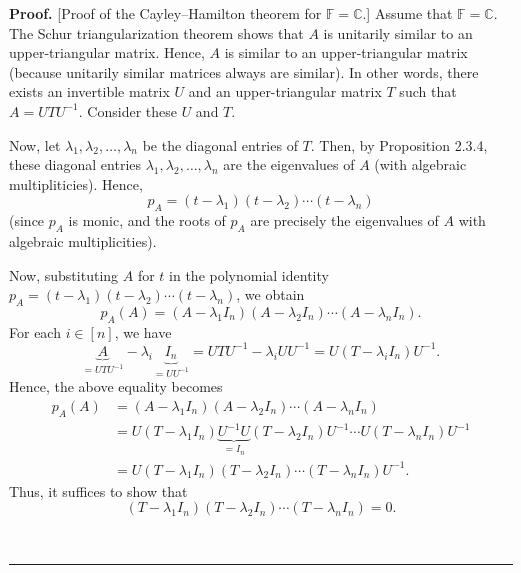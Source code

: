 \documentclass[numbers=enddot,12pt,final,onecolumn,notitlepage]{scrartcl}%
\numberwithin{exer}{subsection}
\theoremstyle{definition}
\newenvironment{proof}[1][Proof]{\noindent\textbf{#1.} }{\ \rule{0.5em}{0.5em}}
\begin{document}
\begin{proof}
[Proof of the Cayley--Hamilton theorem for $\mathbb{F}=\mathbb{C}$.] Assume
that $\mathbb{F}=\mathbb{C}$. The Schur triangularization theorem shows that
$A$ is unitarily similar to an upper-triangular matrix. Hence, $A$ is similar
to an upper-triangular matrix (because unitarily similar matrices always are
similar). In other words, there exists an invertible matrix $U$ and an
upper-triangular matrix $T$ such that $A=UTU^{-1}$. Consider these $U$ and $T$.

Now, let $\lambda_{1},\lambda_{2},\ldots,\lambda_{n}$ be the diagonal entries
of $T$. Then, by Proposition 2.3.4, these diagonal entries $\lambda
_{1},\lambda_{2},\ldots,\lambda_{n}$ are the eigenvalues of $A$ (with
algebraic multipliticies). Hence,%
\[
p_{A}=\left(  t-\lambda_{1}\right)  \left(  t-\lambda_{2}\right)
\cdots\left(  t-\lambda_{n}\right)
\]
(since $p_{A}$ is monic, and the roots of $p_{A}$ are precisely the
eigenvalues of $A$ with algebraic multiplicities).

Now, substituting $A$ for $t$ in the polynomial identity $p_{A}=\left(
t-\lambda_{1}\right)  \left(  t-\lambda_{2}\right)  \cdots\left(
t-\lambda_{n}\right)  $, we obtain
\[
p_{A}\left(  A\right)  =\left(  A-\lambda_{1}I_{n}\right)  \left(
A-\lambda_{2}I_{n}\right)  \cdots\left(  A-\lambda_{n}I_{n}\right)  .
\]
For each $i\in\left[  n\right]  $, we have%
\[
\underbrace{A}_{=UTU^{-1}}-\lambda_{i}\underbrace{I_{n}}_{=UU^{-1}}%
=UTU^{-1}-\lambda_{i}UU^{-1}=U\left(  T-\lambda_{i}I_{n}\right)  U^{-1}.
\]
Hence, the above equality becomes%
\begin{align*}
p_{A}\left(  A\right)    & =\left(  A-\lambda_{1}I_{n}\right)  \left(
A-\lambda_{2}I_{n}\right)  \cdots\left(  A-\lambda_{n}I_{n}\right)  \\
& =U\left(  T-\lambda_{1}I_{n}\right)  \underbrace{U^{-1}U}_{=I_{n}}\left(
T-\lambda_{2}I_{n}\right)  U^{-1}\cdots U\left(  T-\lambda_{n}I_{n}\right)
U^{-1}\\
& =U\left(  T-\lambda_{1}I_{n}\right)  \left(  T-\lambda_{2}I_{n}\right)
\cdots\left(  T-\lambda_{n}I_{n}\right)  U^{-1}.
\end{align*}
Thus, it suffices to show that%
\[
\left(  T-\lambda_{1}I_{n}\right)  \left(  T-\lambda_{2}I_{n}\right)
\cdots\left(  T-\lambda_{n}I_{n}\right)  =0.
\]



\end{proof}
\end{document}
